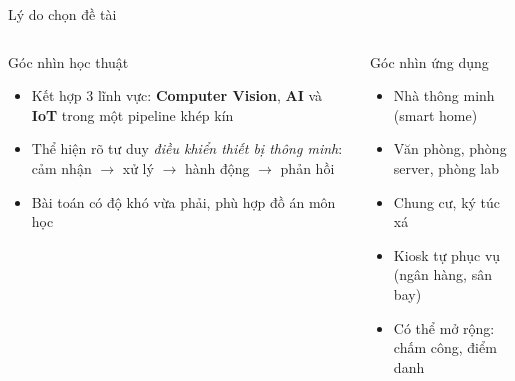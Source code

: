 \documentclass[aspectratio=169]{beamer}
\begin{document}
\begin{frame}{Lý do chọn đề tài}
  \begin{columns}[T]
      \begin{block}{Góc nhìn học thuật}
        \begin{itemize}
          \item Kết hợp 3 lĩnh vực: \textbf{Computer Vision}, \textbf{AI} và \textbf{IoT} trong một pipeline khép kín
          \item Thể hiện rõ tư duy \textit{điều khiển thiết bị thông minh}: cảm nhận $\to$ xử lý $\to$ hành động $\to$ phản hồi
          \item Bài toán có độ khó vừa phải, phù hợp đồ án môn học
        \end{itemize}
      \end{block}

      \begin{block}{Góc nhìn ứng dụng}
        \begin{itemize}
          \item Nhà thông minh (smart home)
          \item Văn phòng, phòng server, phòng lab
          \item Chung cư, ký túc xá
          \item Kiosk tự phục vụ (ngân hàng, sân bay)
          \item Có thể mở rộng: chấm công, điểm danh
        \end{itemize}
      \end{block}
  \end{columns}
\end{frame}
\end{document}
